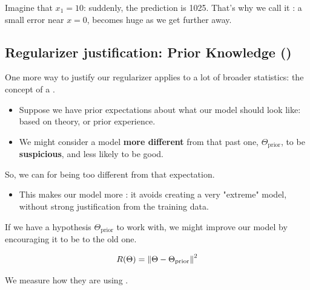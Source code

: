             Imagine that $x_1=10$: suddenly, the prediction is 1025. That's why we call it : a small error near $x=0$, becomes huge as we get further away.


    

    \pagebreak
    \subsection{Regularizer justification: Prior Knowledge ()}

        One more way to justify our regularizer applies to a lot of broader statistics: the concept of a .

        \begin{itemize}
            \item Suppose we have prior expectations about what our model should look like: based on theory, or prior experience.

            \item We might consider a model \textbf{more different} from that past one, $\Theta_{\text{prior}}$, to be \textbf{suspicious}, and less likely to be good.
        \end{itemize}

        So, we can  for being too different from that expectation.

        \begin{itemize}
            \item This makes our model more : it avoids creating a very "extreme" model, without strong justification from the training data.
                \\ 
        \end{itemize}
       
        \begin{concept}
            If we have a  hypothesis $\Theta_{\text{prior}}$ to work with, we might improve our  model by encouraging it to be  to the old one.
            
            \begin{equation*}
                R(\Theta)= \left\lVert \Theta - \Theta_{\text{prior}} \right\rVert^2
            \end{equation*}
            
            We measure how  they are using .
            
        \end{concept}
        
